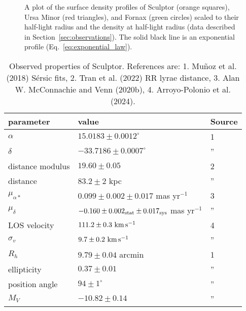 \begin{figure}
\centering
{}
\caption[Sculptor and Ursa Minor match tidal models]{A plot of the
surface density profiles of Sculptor (orange squares), Ursa Minor (red
triangles), and Fornax (green circles) scaled to their half-light radius
and the density at half-light radius (data described in
Section~\ref{sec:observations}). The solid black line is an exponential
profile (Eq.~\ref{eq:exponential_law}).}\label{fig:scl_umi_vs_fornax}
\end{figure}

\begin{table*}[t]
\centering
\caption[Observed Properties of Sculptor]{Observed properties of Sculptor. References are: 1. Muñoz et al. (2018) Sérsic fits, 2. Tran et al. (2022) RR lyrae distance, 3. Alan W. McConnachie and Venn (2020b), 4. Arroyo-Polonio et al. (2024). }
\label{tbl:scl_obs_props}
\begin{tabular}{lll}
\toprule
parameter & value & Source\\
\midrule
$\alpha$ & $15.0183 \pm 0.0012^\circ$ & 1\\
$\delta$ & $-33.7186 \pm 0.0007^\circ$ & ”\\
distance modulus & $19.60 \pm 0.05$ & 2\\
distance & $83.2 \pm 2$ kpc & ”\\
$\mu_{\alpha*}$ & $0.099 \pm 0.002 \pm 0.017$ mas yr$^{-1}$ & 3\\
$\mu_\delta$ & $-0.160 \pm 0.002_{\rm stat} \pm 0.017_{\rm sys}$ mas yr$^{-1}$ & ”\\
LOS velocity & $111.2 \pm 0.3\ {\rm km\,s^{-1}}$ & 4\\
$\sigma_v$ & $9.7\pm0.2\ {\rm km\,s^{-1}}$ & ”\\
$R_h$ & $9.79 \pm 0.04$ arcmin & 1\\
ellipticity & $0.37 \pm 0.01$ & ”\\
position angle & $94\pm1^\circ$ & ”\\
$M_V$ & $-10.82\pm0.14$ & ”\\
\bottomrule
\end{tabular}
\end{table*}


